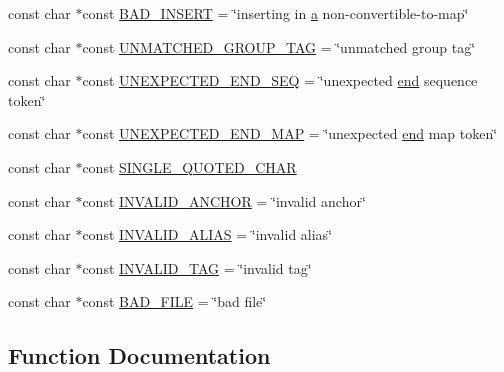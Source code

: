 \begin{DoxyCompactItemize}
\item 
const char $\ast$const \mbox{\hyperlink{namespace_y_a_m_l_1_1_error_msg_a21b49e79d719371f115224eb36e1d81d}{B\+A\+D\+\_\+\+I\+N\+S\+E\+RT}} = \char`\"{}inserting in \mbox{\hyperlink{glad_8h_ac8729153468b5dcf13f971b21d84d4e5}{a}} non-\/convertible-\/to-\/map\char`\"{}
\item 
const char $\ast$const \mbox{\hyperlink{namespace_y_a_m_l_1_1_error_msg_aaa69ecc70caa7224644dfb11605e538c}{U\+N\+M\+A\+T\+C\+H\+E\+D\+\_\+\+G\+R\+O\+U\+P\+\_\+\+T\+AG}} = \char`\"{}unmatched group tag\char`\"{}
\item 
const char $\ast$const \mbox{\hyperlink{namespace_y_a_m_l_1_1_error_msg_a9debb892c2d24a6fc94cd09347ec3d0c}{U\+N\+E\+X\+P\+E\+C\+T\+E\+D\+\_\+\+E\+N\+D\+\_\+\+S\+EQ}} = \char`\"{}unexpected \mbox{\hyperlink{glad_8h_a432111147038972f06e049e18a837002}{end}} sequence token\char`\"{}
\item 
const char $\ast$const \mbox{\hyperlink{namespace_y_a_m_l_1_1_error_msg_ab523f9cc6c9e7490584e344fe7bb549e}{U\+N\+E\+X\+P\+E\+C\+T\+E\+D\+\_\+\+E\+N\+D\+\_\+\+M\+AP}} = \char`\"{}unexpected \mbox{\hyperlink{glad_8h_a432111147038972f06e049e18a837002}{end}} map token\char`\"{}
\item 
const char $\ast$const \mbox{\hyperlink{namespace_y_a_m_l_1_1_error_msg_a725bce1a39331562ff42718a0a29bb56}{S\+I\+N\+G\+L\+E\+\_\+\+Q\+U\+O\+T\+E\+D\+\_\+\+C\+H\+AR}}
\item 
const char $\ast$const \mbox{\hyperlink{namespace_y_a_m_l_1_1_error_msg_a36a144f47e57b66fdeeafdec1833178b}{I\+N\+V\+A\+L\+I\+D\+\_\+\+A\+N\+C\+H\+OR}} = \char`\"{}invalid anchor\char`\"{}
\item 
const char $\ast$const \mbox{\hyperlink{namespace_y_a_m_l_1_1_error_msg_ae5aed8f67de0bce46c4871490566e33c}{I\+N\+V\+A\+L\+I\+D\+\_\+\+A\+L\+I\+AS}} = \char`\"{}invalid alias\char`\"{}
\item 
const char $\ast$const \mbox{\hyperlink{namespace_y_a_m_l_1_1_error_msg_a6a60bebf8c932e09252b4bf898e09316}{I\+N\+V\+A\+L\+I\+D\+\_\+\+T\+AG}} = \char`\"{}invalid tag\char`\"{}
\item 
const char $\ast$const \mbox{\hyperlink{namespace_y_a_m_l_1_1_error_msg_acb86302be9624ebd956e3cd514e41fb2}{B\+A\+D\+\_\+\+F\+I\+LE}} = \char`\"{}bad file\char`\"{}
\end{DoxyCompactItemize}


\subsection{Function Documentation}
\mbox{\label{namespace_y_a_m_l_1_1_error_msg_afa3413b7b43dffb46551048eefd2a7ed}} 

